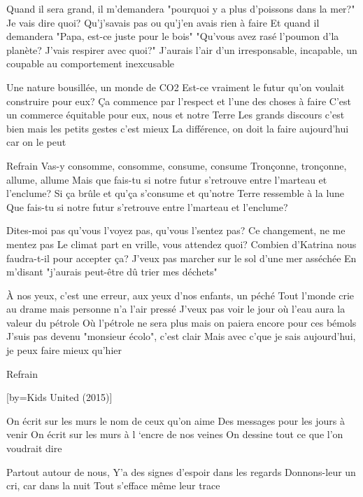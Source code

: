 \beginverse
Quand il sera grand, il m'demandera "pourquoi y a plus d'poissons dans la mer?"
Je vais dire quoi? Qu'j'savais pas ou qu'j'en avais rien à faire
Et quand il demandera "Papa, est-ce juste pour le bois"
"Qu'vous avez rasé l'poumon d'la planète? J'vais respirer avec quoi?"
J'aurais l'air d'un irresponsable, incapable, un coupable au comportement inexcusable
\endverse

\beginverse
Une nature bousillée, un monde de CO2
Est-ce vraiment le futur qu'on voulait construire pour eux?
Ça commence par l'respect et l'une des choses à faire
C'est un commerce équitable pour eux, nous et notre Terre
Les grands discours c'est bien mais les petits gestes c'est mieux
La différence, on doit la faire aujourd'hui car on le peut
\endverse

\beginverse
Refrain
Vas-y consomme, consomme, consume, consume
Tronçonne, tronçonne, allume, allume
Mais que fais-tu si notre futur s'retrouve entre l'marteau et l'enclume?
Si ça brûle et qu'ça s'consume et qu'notre Terre ressemble à la lune
Que fais-tu si notre futur s'retrouve entre l'marteau et l'enclume?
\endverse

\beginverse
Dites-moi pas qu'vous l'voyez pas, qu'vous l'sentez pas?
Ce changement, ne me mentez pas
Le climat part en vrille, vous attendez quoi?
Combien d'Katrina nous faudra-t-il pour accepter ça?
J'veux pas marcher sur le sol d'une mer asséchée
En m'disant "j'aurais peut-être dû trier mes déchets"
\endverse

\beginverse
À nos yeux, c'est une erreur, aux yeux d'nos enfants, un péché
Tout l'monde crie au drame mais personne n'a l'air pressé
J'veux pas voir le jour où l'eau aura la valeur du pétrole
Où l'pétrole ne sera plus mais on paiera encore pour ces bémols
J'suis pas devenu "monsieur écolo", c'est clair
Mais avec c'que je sais aujourd'hui, je peux faire mieux qu'hier
\endverse

\beginverse
Refrain \\[bis]
\endverse

[by={Kids United (2015)}]

\beginverse
On écrit sur les murs le nom de ceux qu’on aime
Des messages pour les jours à venir
On écrit sur les murs à l ‘encre de nos veines
On dessine tout ce que l’on voudrait dire
\endverse

\beginverse
Partout autour de nous,
Y’a des signes d’espoir dans les regards
Donnons-leur un cri, car dans la nuit
Tout s’efface même leur trace
\endverse

